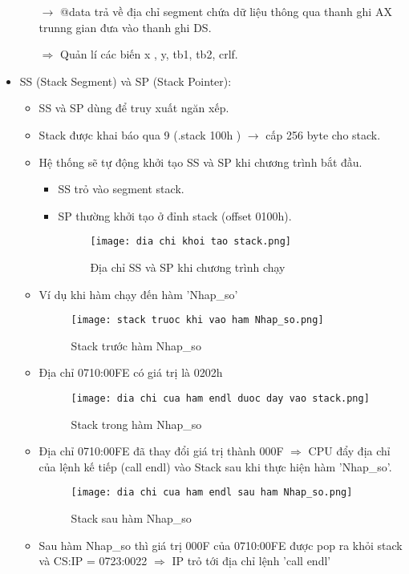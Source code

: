 \begin{itemize}
\begin{itemize}
        $\rightarrow$ @data trả về địa chỉ segment chứa dữ liệu thông qua thanh ghi AX trunng gian đưa vào thanh ghi DS.

            $\Rightarrow$ Quản lí các biến x , y, tb1, tb2, crlf.
    \end{itemize}

    \item SS (Stack Segment) và SP (Stack Pointer):
    \begin{itemize}
        \item SS và SP dùng để truy xuất ngăn xếp.
        \item Stack được khai báo qua 9 (.stack 100h ) $\rightarrow$ cấp 256 byte cho stack.
        \item Hệ thống sẽ tự động khởi tạo SS và SP khi chương trình bắt đầu.
        \begin{itemize}
            \item SS trỏ vào segment stack.
            \item SP thường khởi tạo ở đỉnh stack (offset 0100h).
            \begin{figure}[H]
            \centering
            \texttt{[image: dia chi khoi tao stack.png]}
            \caption{Địa chỉ SS và SP khi chương trình chạy}
        \end{figure}
        \end{itemize}
        \item Ví dụ khi hàm chạy đến hàm 'Nhap\_so'
        \begin{figure}[H]
            \centering
            \texttt{[image: stack truoc khi vao ham Nhap\_so.png]}
            \caption{Stack trước hàm Nhap\_so}
        \end{figure}
        \item Địa chỉ 0710:00FE có giá trị là 0202h
        \begin{figure}[H]
            \centering
            \texttt{[image: dia chi cua ham endl duoc day vao stack.png]}
            \caption{Stack trong hàm Nhap\_so}
        \end{figure}
        \item Địa chỉ 0710:00FE đã thay đổi giá trị thành 000F $\Rightarrow$ CPU đẩy địa chỉ của lệnh kế tiếp (call endl)  vào Stack sau khi thực hiện hàm 'Nhap\_so'.
        \begin{figure}[H]
            \centering
            \texttt{[image: dia chi cua ham endl sau ham Nhap\_so.png]}
            \caption{Stack sau hàm Nhap\_so}
        \end{figure}
        \item Sau hàm Nhap\_so thì giá trị 000F của 0710:00FE được pop ra khỏi stack và CS:IP = 0723:0022 $\Rightarrow$ IP trỏ tới địa chỉ lệnh 'call endl' 
    \end{itemize}


\end{itemize}
